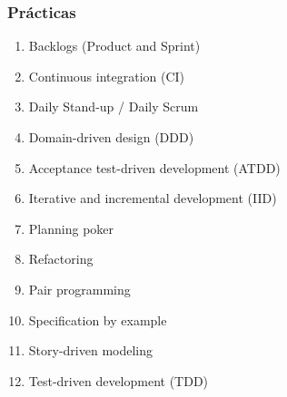     \subsubsection{Prácticas}

    \begin{enumerate}
        \item Backlogs (Product and Sprint)
        \item Continuous integration (CI)
        \item Daily Stand-up / Daily Scrum
        \item Domain-driven design (DDD)
        \item Acceptance test-driven development (ATDD)
        \item Iterative and incremental development (IID)
        \item Planning poker
        \item Refactoring
        \item Pair programming
        \item Specification by example
        \item Story-driven modeling
        \item Test-driven development (TDD)
    \end{enumerate}

